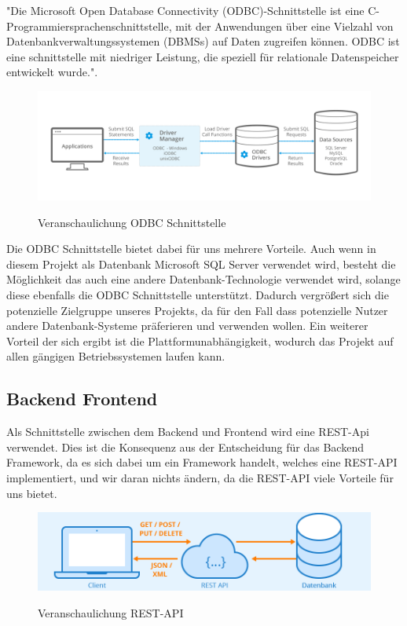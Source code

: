 \documentclass{article}
\begin{document}
"Die Microsoft Open Database Connectivity (ODBC)-Schnittstelle ist eine C-Programmiersprachenschnittstelle, mit der Anwendungen über eine Vielzahl von Datenbankverwaltungssystemen (DBMSs) auf Daten zugreifen können. ODBC ist eine schnittstelle mit niedriger Leistung, die speziell für relationale Datenspeicher entwickelt wurde."\cite{MSODBC}.

\begin{figure}[h]
    \centering
    \includegraphics[width= \textwidth]{images/odbc.png}
    \caption{Veranschaulichung ODBC Schnittstelle}
    \label{fig:beispiel}
    \cite{ODBC}
\end{figure}

Die ODBC Schnittstelle bietet dabei für uns mehrere Vorteile. Auch wenn in
diesem Projekt als Datenbank Microsoft SQL Server verwendet wird, besteht die
Möglichkeit das auch eine andere Datenbank-Technologie verwendet wird, solange
diese ebenfalls die ODBC Schnittstelle unterstützt. Dadurch vergrößert sich die
potenzielle Zielgruppe unseres Projekts, da für den Fall dass potenzielle
Nutzer andere Datenbank-Systeme präferieren und verwenden wollen. Ein weiterer
Vorteil der sich ergibt ist die Plattformunabhängigkeit, wodurch das Projekt
auf allen gängigen Betriebssystemen laufen kann.

\subsection{Backend Frontend}
Als Schnittstelle zwischen dem Backend und Frontend wird eine REST-Api
verwendet. Dies ist die Konsequenz aus der Entscheidung für das Backend
Framework, da es sich dabei um ein Framework handelt, welches eine REST-API
implementiert, und wir daran nichts ändern, da die REST-API viele Vorteile für
uns bietet.

\begin{figure}[h]
    \centering
    \includegraphics[width= \textwidth]{images/Rest-API.png}
    \caption{Veranschaulichung REST-API}
    \label{fig:beispiel}
    \cite{REST}
\end{figure}
\end{document}
